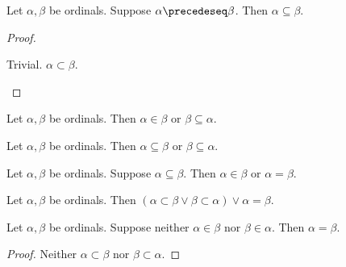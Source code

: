 \begin{proposition}\label{ordinal_preceq_implies_subseteq}
Let $\alpha,\beta$ be ordinals.
Suppose $\alpha\precedeseq\beta$.
Then $\alpha\subseteq\beta$.
\end{proposition}
\begin{proof}
    \begin{byCase}
            Trivial.
            $\alpha\subset\beta$.
    \end{byCase}
\end{proof}



\begin{proposition}\label{ordinal_elem_or_subseteq}
    Let $\alpha,\beta$ be ordinals.
    Then $\alpha\in\beta$ or $\beta\subseteq\alpha$.
\end{proposition}


\begin{proposition}\label{ordinal_subseteq_or_subseteq}
    Let $\alpha,\beta$ be ordinals.
    Then $\alpha\subseteq\beta$ or $\beta\subseteq\alpha$.
\end{proposition}


\begin{proposition}\label{ordinal_subseteq_implies_elem_or_eq}
    Let $\alpha,\beta$ be ordinals.
    Suppose $\alpha\subseteq\beta$.
    Then $\alpha\in\beta$ or $\alpha = \beta$.
\end{proposition}


\begin{corollary}\label{ordinal_subset_trichotomy}
    Let $\alpha,\beta$ be ordinals.
    Then $(\alpha\subset\beta \lor \beta\subset\alpha) \lor \alpha = \beta$.
\end{corollary}

\begin{proposition}\label{ordinal_nor_elem_implies_eq}
    Let $\alpha,\beta$ be ordinals.
    Suppose neither $\alpha\in\beta$ nor $\beta\in\alpha$.
    Then $\alpha = \beta$.
\end{proposition}
\begin{proof}
    Neither $\alpha\subset\beta$ nor $\beta\subset\alpha$.
\end{proof}

